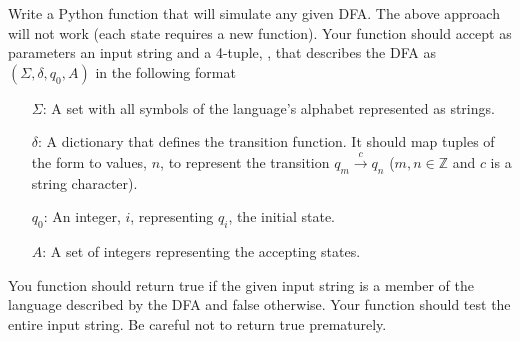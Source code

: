 \begin{problem}
Write a Python function that will simulate any given DFA.  
The above approach will not work (each state requires a new function).
Your function should accept as parameters an input string and a 4-tuple, , that describes the DFA as $(\Sigma, \delta, q_0, A)$ in the following format
\begin{itemize}
\item[$\Sigma$:] A set with all symbols of the language's alphabet represented as strings.
\item[$\delta$:] A dictionary that defines the transition function.
It should map tuples of the form  to values, $n$, to represent the transition $q_m \xrightarrow{c} q_n$ ($m, n \in \mathbb{Z}$ and $c$ is a string character).
\item[$q_0$:] An integer, $i$, representing $q_i$, the initial state.
\item[$A$:] A set of integers representing the accepting states.
\end{itemize}
You function should return true if the given input string is a member of the language described by the DFA and false otherwise.
Your function should test the entire input string.  Be careful not to return true prematurely.
\label{prob:dfa_sim}
\end{problem}

